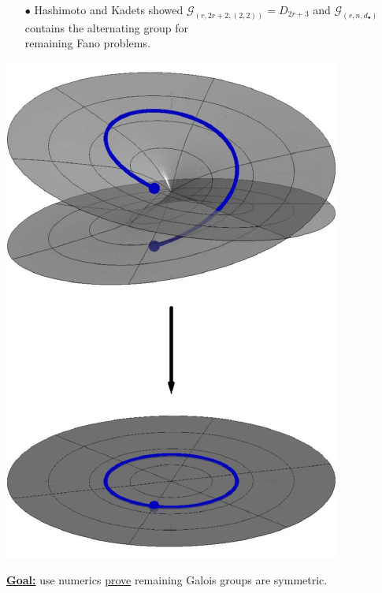 \documentclass{beamer}
\begin{document}
\begin{frame}
\begin{minipage}{.73\textwidth}
\begin{enumerate}
\item[$\bullet$] Hashimoto and Kadets showed $\mathcal{G}_{(r,2r+2,(2,2))}=D_{2r+3}$ and $\mathcal{G}_{(r,n,d_\bullet)}$ \\
contains the alternating group for \\
remaining Fano problems.
\end{enumerate}
\end{minipage}
%
\begin{minipage}{.25\textwidth}
\begin{center}
\includegraphics[scale=.5]{figures/monodromy.pdf}
\end{center}
\end{minipage}

\vspace{.15cm}

\textbf{\underline{Goal:}} use numerics \underline{prove} remaining Galois groups are symmetric. 

\end{frame}

\end{document}
